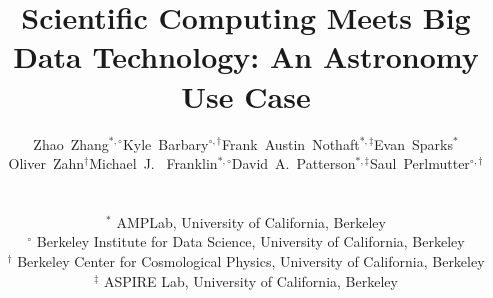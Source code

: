 \documentclass[conference]{IEEEtran}
\newcommand{\up}{\vspace*{-1em}}
\begin{document}
%

\title{Scientific Computing Meets Big Data Technology: An Astronomy Use Case}

%
%
%
%
%

\author{
\begin{tabular}{cccc}
{Zhao~Zhang$^{*,\circ}$} & {Kyle~Barbary$^{\circ,\dagger}$} & {Frank~Austin~Nothaft$^{*,\ddagger}$} & {Evan~Sparks$^*$} \\
{Oliver~Zahn$^\dagger$} & {Michael~J.~ Franklin$^{*,\circ}$} & {David~A.~Patterson$^{*,\ddagger}$} & {Saul~Perlmutter$^{\circ,\dagger}$}
\end{tabular}
\\%
\begin{tabular}{c}
$^*$ AMPLab, University of California, Berkeley \\
$^\circ$ Berkeley Institute for Data Science, University of California, Berkeley\\
$^\dagger$ Berkeley Center for Cosmological Physics, University of California, Berkeley\\
$^\ddagger$ ASPIRE Lab, University of California, Berkeley \\
\up\up
\end{tabular}
} 
\end{document}
